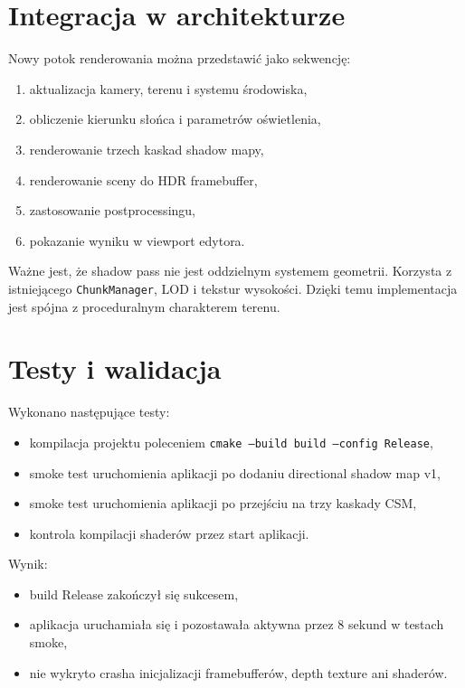 \documentclass[12pt,a4paper]{article}
\begin{document}
\section{Integracja w architekturze}

Nowy potok renderowania można przedstawić jako sekwencję:

\begin{enumerate}
    \item aktualizacja kamery, terenu i systemu środowiska,
    \item obliczenie kierunku słońca i parametrów oświetlenia,
    \item renderowanie trzech kaskad shadow mapy,
    \item renderowanie sceny do HDR framebuffer,
    \item zastosowanie postprocessingu,
    \item pokazanie wyniku w viewport edytora.
\end{enumerate}

Ważne jest, że shadow pass nie jest oddzielnym systemem geometrii. Korzysta z istniejącego \texttt{ChunkManager}, LOD i tekstur wysokości. Dzięki temu implementacja jest spójna z proceduralnym charakterem terenu.

\section{Testy i walidacja}

Wykonano następujące testy:

\begin{itemize}
    \item kompilacja projektu poleceniem \texttt{cmake --build build --config Release},
    \item smoke test uruchomienia aplikacji po dodaniu directional shadow map v1,
    \item smoke test uruchomienia aplikacji po przejściu na trzy kaskady CSM,
    \item kontrola kompilacji shaderów przez start aplikacji.
\end{itemize}

Wynik:

\begin{itemize}
    \item build Release zakończył się sukcesem,
    \item aplikacja uruchamiała się i pozostawała aktywna przez 8 sekund w testach smoke,
    \item nie wykryto crasha inicjalizacji framebufferów, depth texture ani shaderów.
\end{itemize}
\end{document}
